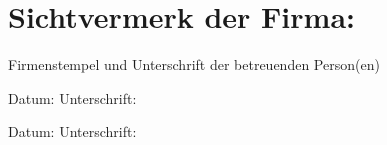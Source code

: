 \chapter*{Sichtvermerk der Firma:}
\label{ch:erklaerung}

\begin{flushleft}
	Firmenstempel und Unterschrift der betreuenden Person(en)
\end{flushleft}
\vspace{1cm}
\begin{flushleft}
	Datum:	\hrulefill\enspace Unterschrift: \hrulefill
\end{flushleft}
\begin{flushleft}
	Datum:	\hrulefill\enspace Unterschrift: \hrulefill
\end{flushleft}

	